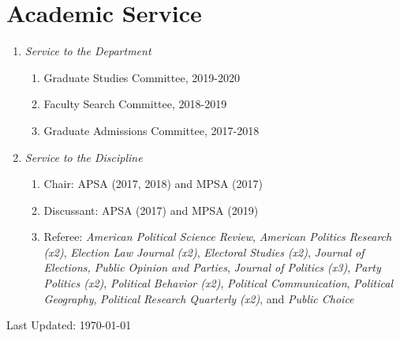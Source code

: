 \documentclass[12pt]{article}
\def\footerlink{}
\begin{document}
\section*{Academic Service} 

\begin{enumerate}[topsep = 0pt, itemsep = -1ex, partopsep  = 1ex, parsep = 1ex]
	
	\item[] \textit{Service to the Department}
	
	\begin{enumerate}[topsep = 0pt, itemsep = -1ex, partopsep = -1ex, parsep = 1ex]
		
		\item[] Graduate Studies Committee, 2019-2020
		\item[] Faculty Search Committee, 2018-2019 
		\item[] Graduate Admissions Committee, 2017-2018 \\
		
	\end{enumerate}

	\item[] \textit{Service to the Discipline}

	\begin{enumerate}[topsep = 0pt, itemsep = -1ex, partopsep  = -1ex, parsep = 1ex]
	
	\item[] Chair: APSA (2017, 2018) and MPSA (2017)
	
	\item[] Discussant: APSA (2017) and MPSA (2019)
	
	\item[] Referee: \textit{American Political Science Review}, \textit{American Politics Research (x2)}, \textit{Election Law Journal (x2)}, \textit{Electoral Studies (x2)}, \textit{Journal of Elections, Public Opinion and Parties}, \textit{Journal of Politics (x3)},  \textit{Party Politics (x2)}, \textit{Political Behavior (x2)}, \textit{Political Communication}, \textit{Political Geography}, \textit{Political Research Quarterly (x2)}, and \textit{Public Choice} \\
	
	\end{enumerate}

\end{enumerate}

\bigskip

\begin{center}
  \begin{footnotesize}
    Last Updated: \today \\
    \href{\footerlink}{\texttt{\footerlink}}
  \end{footnotesize}
\end{center}
\end{document}
